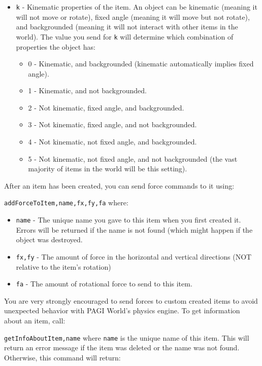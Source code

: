 \begin{itemize}
\item \texttt{k} - Kinematic properties of the item. An object can be kinematic (meaning it will not move or rotate), fixed angle (meaning it will move but not rotate), and backgrounded (meaning it will not interact with other items in the world). The value you send for \texttt{k} will determine which combination of properties the object has:
	\begin{itemize}
	\item 0 - Kinematic, and backgrounded (kinematic automatically implies fixed angle).
	\item 1 - Kinematic, and not backgrounded. 
	\item 2 - Not kinematic, fixed angle, and backgrounded.
	\item 3 - Not kinematic, fixed angle, and not backgrounded.
	\item 4 - Not kinematic, not fixed angle, and backgrounded.
	\item 5 - Not kinematic, not fixed angle, and not backgrounded (the vast majority of items in the world will be this setting).
	\end{itemize}
\end{itemize}

After an item has been created, you can send force commands to it using:

\texttt{addForceToItem,name,fx,fy,fa} where:

\begin{itemize}
\item \texttt{name} - The unique name you gave to this item when you first created it. Errors will be returned if the name is not found (which might happen if the object was destroyed.
\item \texttt{fx,fy} - The amount of force in the horizontal and vertical directions (NOT relative to the item's rotation)
\item \texttt{fa} - The amount of rotational force to send to this item.
\end{itemize}

You are very strongly encouraged to send forces to custom created items to avoid unexpected behavior with PAGI World's physics engine. %
To get information about an item, call:

\texttt{getInfoAboutItem,name} where \texttt{name} is the unique name of this item. This will return an error message if the item was deleted or the name was not found. Otherwise, this command will return:

